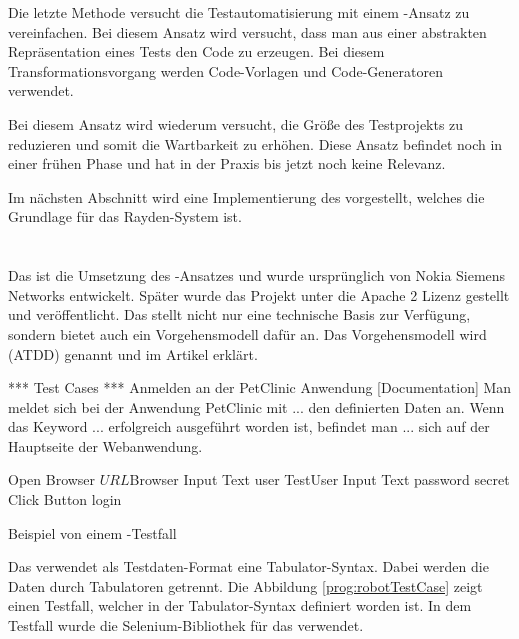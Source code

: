 Die letzte Methode versucht die Testautomatisierung mit einem -Ansatz zu vereinfachen. Bei diesem Ansatz wird versucht, dass man aus einer abstrakten Repräsentation eines Tests den Code zu erzeugen. Bei diesem Transformationsvorgang werden Code-Vorlagen und Code-Generatoren verwendet.

\SuperPar
Bei diesem Ansatz wird wiederum versucht, die Größe des Testprojekts zu reduzieren und somit die Wartbarkeit zu erhöhen. Diese Ansatz befindet noch in einer frühen Phase und hat in der Praxis bis jetzt noch keine Relevanz. 

\SuperPar
Im nächsten Abschnitt wird eine Implementierung des  vorgestellt, welches die Grundlage für das Rayden-System ist.

\section{}

Das  \cite{Robot} ist die Umsetzung des -Ansatzes und wurde ursprünglich von Nokia Siemens Networks entwickelt. Später wurde das Projekt unter die Apache 2 Lizenz gestellt und veröffentlicht. Das  stellt nicht nur eine technische Basis zur Verfügung, sondern bietet auch ein Vorgehensmodell dafür an. Das Vorgehensmodell wird  (ATDD) genannt und im Artikel \cite{Lar10} erklärt.

\begin{program}
\begin{JavaCode}
*** Test Cases ***
Anmelden an der PetClinic Anwendung
	[Documentation]	Man meldet sich bei der Anwendung PetClinic mit 
	...             den definierten Daten an. Wenn das Keyword 
	...             erfolgreich ausgeführt worden ist, befindet man 
	...             sich auf der Hauptseite der Webanwendung.
	
	Open Browser	${URL}		${Browser}
	Input Text    user			TestUser
	Input Text		password	secret
	Click Button	login

\end{JavaCode}
\caption{Beispiel von einem -Testfall}
\label{prog:robotTestCase}
\end{program}

\SuperPar
Das  verwendet als Testdaten-Format eine Tabulator-Syntax. Dabei werden die Daten durch Tabulatoren getrennt. Die Abbildung \ref{prog:robotTestCase} zeigt einen Testfall, welcher in der Tabulator-Syntax definiert worden ist. In dem Testfall wurde die Selenium-Bibliothek für das  verwendet. 

